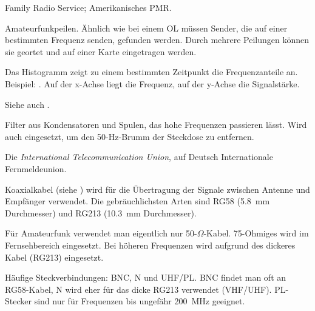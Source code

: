 {Family Radio Service; Amerikanisches PMR.}

{Amateurfunkpeilen. Ähnlich wie bei einem OL müssen Sender, die auf einer bestimmten Frequenz senden, gefunden werden. Durch mehrere Peilungen können sie geortet und auf einer Karte eingetragen werden. }

{}

{Das Histogramm zeigt zu einem bestimmten Zeitpunkt die Frequenzanteile an. Beispiel: . Auf der x-Achse liegt die Frequenz, auf der y-Achse die Signalstärke.

Siehe auch .}

{Filter aus Kondensatoren und Spulen, das hohe Frequenzen passieren lässt. Wird auch eingesetzt, um den 50-Hz-Brumm der Steckdose zu entfernen.}

{Die \textit{International Telecommunication Union}, auf Deutsch Internationale Fernmeldeunion. }

{Koaxialkabel (siehe ) wird für die Übertragung der Signale zwischen Antenne und Empfänger verwendet. Die gebräuchlichsten Arten sind RG58 (5.8 mm Durchmesser) und RG213 (10.3 mm Durchmesser).

Für Amateurfunk verwendet man eigentlich nur 50-$\Omega$-Kabel. 75-Ohmiges wird im Fernsehbereich eingesetzt. Bei höheren Frequenzen wird aufgrund des  dickeres Kabel (RG213) eingesetzt.
}

{Häufige Steckverbindungen: BNC, N und UHF/PL. BNC findet man oft an RG58-Kabel, N wird eher für das dicke RG213 verwendet (VHF/UHF). PL-Stecker sind nur für Frequenzen bis ungefähr 200 MHz geeignet.}

